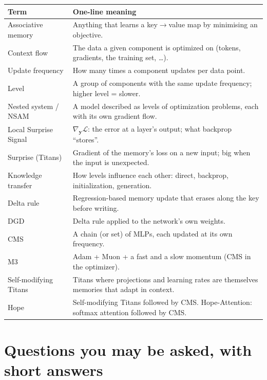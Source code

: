 \documentclass[11pt,a4paper]{article}
\newcommand{\Lc}{\mathcal{L}}
\newcommand{\by}{\mathbf{y}}
\begin{document}
\begin{center}
\begin{tabularx}{\textwidth}{@{}lX@{}}
\toprule
\textbf{Term} & \textbf{One-line meaning}\\
\midrule
Associative memory & Anything that learns a key$\to$value map by minimising an objective.\\
Context flow & The data a given component is optimized on (tokens, gradients, the training set, \dots).\\
Update frequency & How many times a component updates per data point.\\
Level & A group of components with the same update frequency; higher level = slower.\\
Nested system / NSAM & A model described as levels of optimization problems, each with its own gradient flow.\\
Local Surprise Signal & $\nabla_{\by}\Lc$: the error at a layer's output; what backprop ``stores''.\\
Surprise (Titans) & Gradient of the memory's loss on a new input; big when the input is unexpected.\\
Knowledge transfer & How levels influence each other: direct, backprop, initialization, generation.\\
Delta rule & Regression-based memory update that erases along the key before writing.\\
DGD & Delta rule applied to the network's own weights.\\
CMS & A chain (or set) of MLPs, each updated at its own frequency.\\
M3 & Adam + Muon + a fast and a slow momentum (CMS in the optimizer).\\
Self-modifying Titans & Titans where projections and learning rates are themselves memories that adapt in context.\\
Hope & Self-modifying Titans followed by CMS. Hope-Attention: softmax attention followed by CMS.\\
\bottomrule
\end{tabularx}
\end{center}

\section{Questions you may be asked, with short answers}
\end{document}
